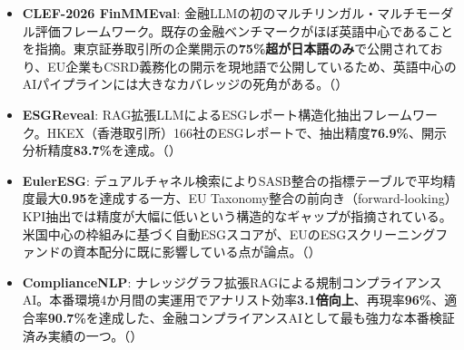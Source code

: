 \begin{itemize}
  \item \textbf{CLEF-2026 FinMMEval}: 金融LLMの初のマルチリンガル・マルチモーダル評価フレームワーク。既存の金融ベンチマークがほぼ英語中心であることを指摘。東京証券取引所の企業開示の\textbf{75\%超が日本語のみ}で公開されており、EU企業もCSRD義務化の開示を現地語で公開しているため、英語中心のAIパイプラインには大きなカバレッジの死角がある。（\cite{finmmeval2026}）
  \item \textbf{ESGReveal}: RAG拡張LLMによるESGレポート構造化抽出フレームワーク。HKEX（香港取引所）166社のESGレポートで、抽出精度\textbf{76.9\%}、開示分析精度\textbf{83.7\%}を達成。（\cite{esgreveal2023}）
  \item \textbf{EulerESG}: デュアルチャネル検索によりSASB整合の指標テーブルで平均精度最大\textbf{0.95}を達成する一方、EU Taxonomy整合の前向き（forward-looking）KPI抽出では精度が大幅に低いという構造的なギャップが指摘されている。米国中心の枠組みに基づく自動ESGスコアが、EUのESGスクリーニングファンドの資本配分に既に影響している点が論点。（\cite{eulereesg2025}）
  \item \textbf{ComplianceNLP}: ナレッジグラフ拡張RAGによる規制コンプライアンスAI。本番環境4か月間の実運用でアナリスト効率\textbf{3.1倍向上}、再現率\textbf{96\%}、適合率\textbf{90.7\%}を達成した、金融コンプライアンスAIとして最も強力な本番検証済み実績の一つ。（\cite{compliancenlp2026}）
\end{itemize}

